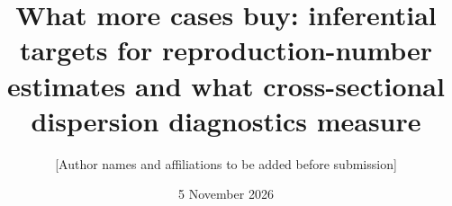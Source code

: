 \documentclass[10pt,a4paper]{article}
\title{\textbf{What more cases buy: inferential targets for reproduction-number estimates and what cross-sectional dispersion diagnostics measure}}
\author{[Author names and affiliations to be added before submission]}
\date{5 November 2026}
\providecommand{\doi}[1]{\href{https://doi.org/#1}{\nolinkurl{doi:#1}}}
\theoremstyle{remark}
\begin{document}
\maketitle
\normalfont\mdseries













\FloatBarrier
\clearpage


\end{document}

